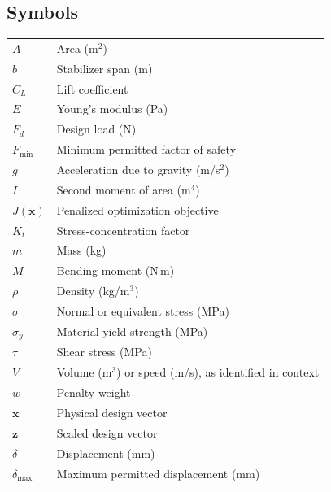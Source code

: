 \documentclass[12pt,a4paper]{report}
\begin{document}
\subsection*{Symbols}
\begin{longtable}{p{}p{}}
$A$ & Area (m$^2$)\\
$b$ & Stabilizer span (m)\\
$C_L$ & Lift coefficient\\
$E$ & Young's modulus (Pa)\\
$F_d$ & Design load (N)\\
$F_{\min}$ & Minimum permitted factor of safety\\
$g$ & Acceleration due to gravity (m/s$^2$)\\
$I$ & Second moment of area (m$^4$)\\
$J(\mathbf{x})$ & Penalized optimization objective\\
$K_t$ & Stress-concentration factor\\
$m$ & Mass (kg)\\
$M$ & Bending moment (N\,m)\\
$\rho$ & Density (kg/m$^3$)\\
$\sigma$ & Normal or equivalent stress (MPa)\\
$\sigma_y$ & Material yield strength (MPa)\\
$\tau$ & Shear stress (MPa)\\
$V$ & Volume (m$^3$) or speed (m/s), as identified in context\\
$w$ & Penalty weight\\
$\mathbf{x}$ & Physical design vector\\
$\mathbf{z}$ & Scaled design vector\\
$\delta$ & Displacement (mm)\\
$\delta_{\max}$ & Maximum permitted displacement (mm)\\
\end{longtable}

\clearpage


\label{page:main-start}









\label{page:main-end}
\clearpage





\appendix

\end{document}
